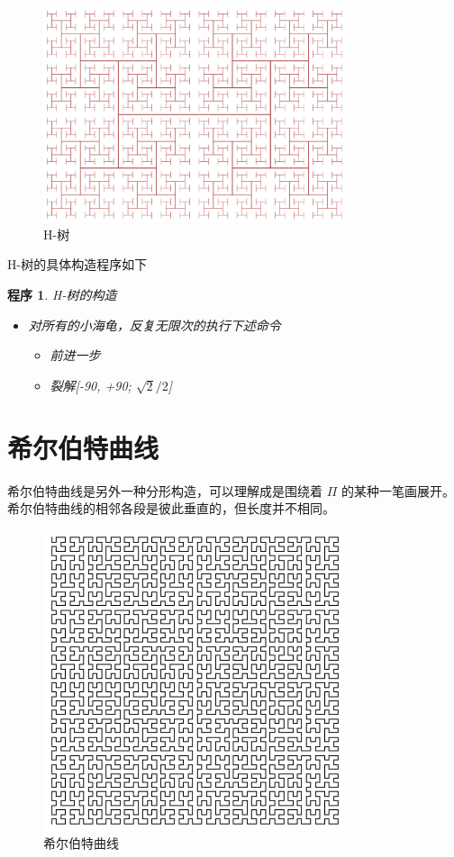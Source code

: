 \documentclass[a4paper,12pt]{article}
\newtheorem{program}{程序}
\begin{document}
\begin{figure}[ht]
\centering
\includegraphics[width=3.5in]{images/2000px-H_tree.png}
\caption{H-树}
\end{figure}

H-树的具体构造程序如下

\begin{program}
H-树的构造
\begin{itemize}
\item 对所有的小海龟，反复无限次的执行下述命令
\begin{itemize}\item 前进一步 \item 裂解[-90, +90; $\sqrt{2} / 2$] \end{itemize}
\end{itemize}
\end{program}

\newpage

\section{希尔伯特曲线}

希尔伯特曲线是另外一种分形构造，可以理解成是围绕着 $\Pi$ 的某种一笔画展开。希尔伯特曲线的相邻各段是彼此垂直的，但长度并不相同。

\begin{figure}[ht]
\centering
\includegraphics[width=3.5in]{images/hilbert.png}
\caption{希尔伯特曲线}
\end{figure}
\end{document}
